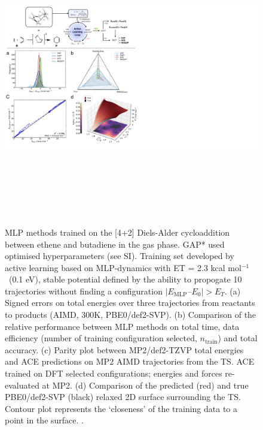 \documentclass[twoside,twocolumn,9pt]{article}
\newcommand{\kcal}{kcal mol$^{-1}$}
\begin{document}
\begin{figure}[t]
	\centering
	\includegraphics[height=13cm]{figX1}
	\caption{MLP methods trained on the [4+2] Diels-Alder cycloaddition between ethene and butadiene in the gas phase. GAP* used optimised hyperparameters (see SI). Training set developed by active learning based on MLP-dynamics with ET = 2.3 \kcal~(0.1 eV), stable potential defined by the ability to propogate 10 trajectories without finding a configuration $|E_\text{MLP} – E_0| > E_T$. (a) Signed errors on total energies over three trajectories from reactants to products (AIMD, 300K, PBE0/def2-SVP). (b) Comparison of the relative performance between MLP methods on total time, data efficiency (number of training configuration selected, $n_\text{train}$) and total accuracy. (c) Parity plot between MP2/def2-TZVP total energies and ACE predictions on MP2 AIMD trajectories from the TS. ACE trained on DFT selected configurations; energies and forces re-evaluated at MP2. (d) Comparison of the predicted (red) and true PBE0/def2-SVP (black) relaxed 2D surface surrounding the TS. Contour plot represents the ‘closeness’ of the training data to a point in the surface. .}
	\label{fig::X1}
\end{figure}
\end{document}
